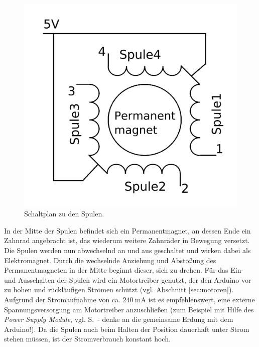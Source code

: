 \hfill
\begin{minipage}{0.3\textwidth}
	\begin{figure}[H]
		\includegraphics[width=\textwidth]{./Zeichnungen/schaltplan-schrittmotor-innen.png}
		\caption{Schaltplan zu den Spulen.}
	\end{figure}
\end{minipage}

\bigskip
In der Mitte der Spulen befindet sich ein Permanentmagnet, an dessen Ende ein Zahnrad angebracht ist, das wiederum weitere Zahnräder in Bewegung versetzt. Die Spulen werden nun abwechselnd an und aus geschaltet und wirken dabei als Elektromagnet. Durch die wechselnde Anziehung und Abstoßung des Permanentmagneten in der Mitte beginnt dieser, sich zu drehen.
Für das Ein- und Ausschalten der Spulen wird ein Motortreiber genutzt, der den Arduino vor zu hohen und rückläufigen Strömen schützt (vgl. Abschnitt \ref{sec:motoren}). Aufgrund der Stromaufnahme von ca. $\SI{240}{\milli\ampere}$ ist es empfehlenswert, eine externe Spannungsversorgung am Motortreiber anzuschließen (zum Beispiel mit Hilfe des \emph{Power Supply Module}, vgl. S.\, \pageref{powersupplymodule} - denke an die gemeinsame Erdung mit dem Arduino!). Da die Spulen auch beim Halten der Position dauerhaft unter Strom stehen müssen, ist der Stromverbrauch konstant hoch.

